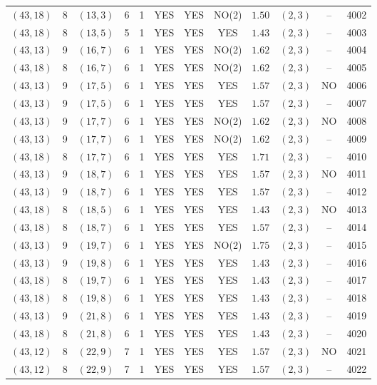 \begin{longtable}{|c|c|c|c|c|c|c|c|c|c|c|c|}
$(43,18)$ & 8 & $(13,3)$ & 6 & 1 & YES & YES & NO(2) & $1.50$ & $(2,3)$ & -- & 4002\\
$(43,18)$ & 8 & $(13,5)$ & 5 & 1 & YES & YES & YES & $1.43$ & $(2,3)$ & -- & 4003\\
$(43,13)$ & 9 & $(16,7)$ & 6 & 1 & YES & YES & NO(2) & $1.62$ & $(2,3)$ & -- & 4004\\
$(43,18)$ & 8 & $(16,7)$ & 6 & 1 & YES & YES & NO(2) & $1.62$ & $(2,3)$ & -- & 4005\\
$(43,13)$ & 9 & $(17,5)$ & 6 & 1 & YES & YES & YES & $1.57$ & $(2,3)$ & NO & 4006\\
$(43,13)$ & 9 & $(17,5)$ & 6 & 1 & YES & YES & YES & $1.57$ & $(2,3)$ & -- & 4007\\
$(43,13)$ & 9 & $(17,7)$ & 6 & 1 & YES & YES & NO(2) & $1.62$ & $(2,3)$ & NO & 4008\\
$(43,13)$ & 9 & $(17,7)$ & 6 & 1 & YES & YES & NO(2) & $1.62$ & $(2,3)$ & -- & 4009\\
$(43,18)$ & 8 & $(17,7)$ & 6 & 1 & YES & YES & YES & $1.71$ & $(2,3)$ & -- & 4010\\
$(43,13)$ & 9 & $(18,7)$ & 6 & 1 & YES & YES & YES & $1.57$ & $(2,3)$ & NO & 4011\\
$(43,13)$ & 9 & $(18,7)$ & 6 & 1 & YES & YES & YES & $1.57$ & $(2,3)$ & -- & 4012\\
$(43,18)$ & 8 & $(18,5)$ & 6 & 1 & YES & YES & YES & $1.43$ & $(2,3)$ & NO & 4013\\
$(43,18)$ & 8 & $(18,7)$ & 6 & 1 & YES & YES & YES & $1.57$ & $(2,3)$ & -- & 4014\\
$(43,13)$ & 9 & $(19,7)$ & 6 & 1 & YES & YES & NO(2) & $1.75$ & $(2,3)$ & -- & 4015\\
$(43,13)$ & 9 & $(19,8)$ & 6 & 1 & YES & YES & YES & $1.43$ & $(2,3)$ & -- & 4016\\
$(43,18)$ & 8 & $(19,7)$ & 6 & 1 & YES & YES & YES & $1.43$ & $(2,3)$ & -- & 4017\\
$(43,18)$ & 8 & $(19,8)$ & 6 & 1 & YES & YES & YES & $1.43$ & $(2,3)$ & -- & 4018\\
$(43,13)$ & 9 & $(21,8)$ & 6 & 1 & YES & YES & YES & $1.43$ & $(2,3)$ & -- & 4019\\
$(43,18)$ & 8 & $(21,8)$ & 6 & 1 & YES & YES & YES & $1.43$ & $(2,3)$ & -- & 4020\\
$(43,12)$ & 8 & $(22,9)$ & 7 & 1 & YES & YES & YES & $1.57$ & $(2,3)$ & NO & 4021\\
$(43,12)$ & 8 & $(22,9)$ & 7 & 1 & YES & YES & YES & $1.57$ & $(2,3)$ & -- & 4022\\

\end{longtable}
